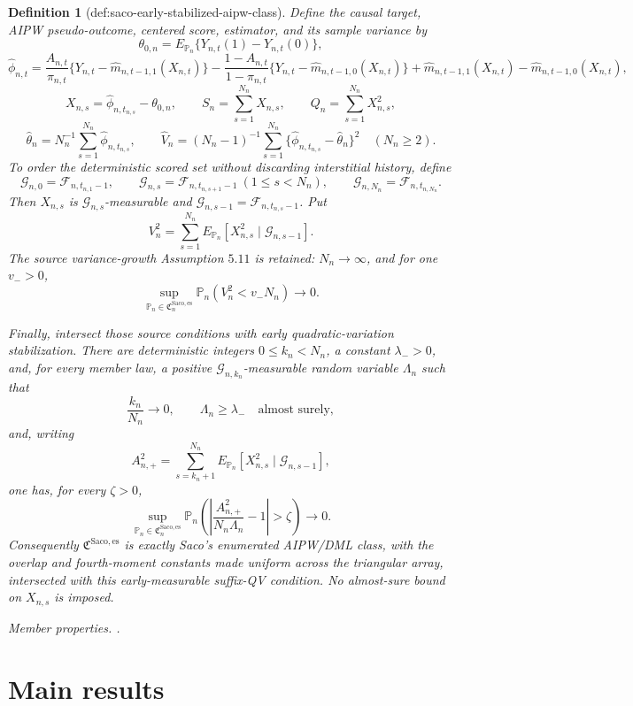 \documentclass{article}
\newtheorem{definition}{Definition}
\begin{document}
\begin{definition}[def:saco-early-stabilized-aipw-class]
Define the causal target, AIPW pseudo-outcome, centered score, estimator, and its sample variance by
\[
\theta_{0,n}=E_{\mathbb P_n}\{Y_{n,t}(1)-Y_{n,t}(0)\},
\]
\[
\widehat\phi_{n,t}=\frac{A_{n,t}}{\pi_{n,t}}
\{Y_{n,t}-\widehat m_{n,t-1,1}(X_{n,t})\}
-\frac{1-A_{n,t}}{1-\pi_{n,t}}
\{Y_{n,t}-\widehat m_{n,t-1,0}(X_{n,t})\}
+\widehat m_{n,t-1,1}(X_{n,t})-\widehat m_{n,t-1,0}(X_{n,t}),
\]
\[
X_{n,s}=\widehat\phi_{n,t_{n,s}}-\theta_{0,n},\qquad
S_n=\sum_{s=1}^{N_n}X_{n,s},\qquad
Q_n=\sum_{s=1}^{N_n}X_{n,s}^2,
\]
\[
\widehat\theta_n=N_n^{-1}\sum_{s=1}^{N_n}\widehat\phi_{n,t_{n,s}},\qquad
\widehat V_n=(N_n-1)^{-1}\sum_{s=1}^{N_n}
\{\widehat\phi_{n,t_{n,s}}-\widehat\theta_n\}^2
\quad(N_n\ge2).
\]
To order the deterministic scored set without discarding interstitial history, define
\[
\mathcal G_{n,0}=\mathcal F_{n,t_{n,1}-1},\qquad
\mathcal G_{n,s}=\mathcal F_{n,t_{n,s+1}-1}\ (1\le s<N_n),\qquad
\mathcal G_{n,N_n}=\mathcal F_{n,t_{n,N_n}}.
\]
Then \(X_{n,s}\) is \(\mathcal G_{n,s}\)-measurable and \(\mathcal G_{n,s-1}=\mathcal F_{n,t_{n,s}-1}\).  Put
\[
V_n^2=\sum_{s=1}^{N_n}E_{\mathbb P_n}[X_{n,s}^2\mid\mathcal G_{n,s-1}].
\]
The source variance-growth Assumption \(5.11\) is retained: \(N_n\to\infty\), and for one \(v_->0\),
\[
\sup_{\mathbb P_n\in\mathfrak C_n^{\mathrm{Saco,es}}}
\mathbb P_n(V_n^2<v_-N_n)\longrightarrow0.
\]

Finally, intersect those source conditions with early quadratic-variation stabilization.  There are deterministic integers \(0\le k_n<N_n\), a constant \(\lambda_->0\), and, for every member law, a positive \(\mathcal G_{n,k_n}\)-measurable random variable \(\Lambda_n\) such that
\[
\frac{k_n}{N_n}\longrightarrow0,\qquad \Lambda_n\ge\lambda_-\quad\text{almost surely},
\]
and, writing
\[
A_{n,+}^2=\sum_{s=k_n+1}^{N_n}
E_{\mathbb P_n}[X_{n,s}^2\mid\mathcal G_{n,s-1}],
\]
one has, for every \(\zeta>0\),
\[
\sup_{\mathbb P_n\in\mathfrak C_n^{\mathrm{Saco,es}}}
\mathbb P_n\left(\left|\frac{A_{n,+}^2}{N_n\Lambda_n}-1\right|>\zeta\right)\longrightarrow0.
\]
Consequently \(\mathfrak C^{\mathrm{Saco,es}}\) is exactly Saco's enumerated AIPW/DML class, with the overlap and fourth-moment constants made uniform across the triangular array, intersected with this early-measurable suffix-QV condition.  No almost-sure bound on \(X_{n,s}\) is imposed.
\par\smallskip\noindent\emph{Member properties.} .
\end{definition}

\section{Main results}
\end{document}
